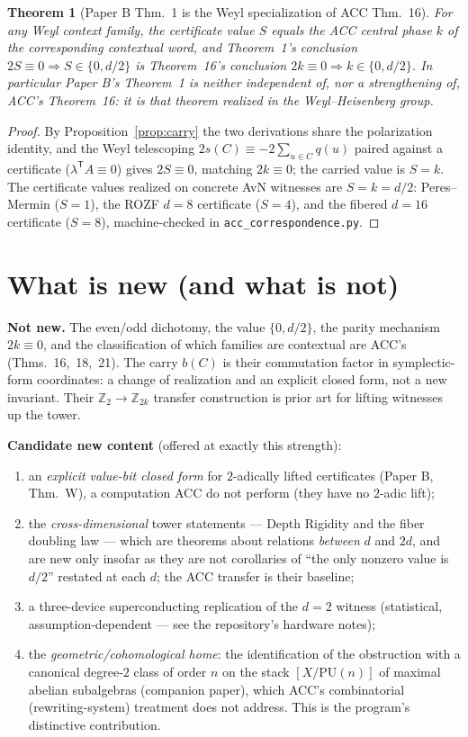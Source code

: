 \documentclass[11pt]{article}
\newtheorem{theorem}{Theorem}
\newcommand{\Z}{\mathbb{Z}}
\begin{document}
\begin{theorem}[Paper B Thm.~1 is the Weyl specialization of ACC Thm.~16]\label{thm:equiv}
For any Weyl context family, the certificate value $S$ equals the ACC central phase $k$ of the
corresponding contextual word, and Theorem~1's conclusion $2S\equiv0\Rightarrow S\in\{0,d/2\}$ is
Theorem~16's conclusion $2k\equiv0\Rightarrow k\in\{0,d/2\}$. In particular Paper B's Theorem~1 is
neither independent of, nor a strengthening of, ACC's Theorem~16: it is that theorem realized in the
Weyl--Heisenberg group.
\end{theorem}
\begin{proof}
By Proposition~\ref{prop:carry} the two derivations share the polarization identity, and the Weyl
telescoping $2s(C)\equiv-2\sum_{u\in C}q(u)$ paired against a certificate ($\lambda^{\mathsf T}A\equiv0$)
gives $2S\equiv0$, matching $2k\equiv0$; the carried value is $S=k$. The certificate values realized on
concrete AvN witnesses are $S=k=d/2$: Peres--Mermin ($S=1$), the ROZF $d=8$ certificate ($S=4$), and the
fibered $d=16$ certificate ($S=8$), machine-checked in \texttt{acc\_correspondence.py}.
\end{proof}

\section{What is new (and what is not)}
\noindent\textbf{Not new.} The even/odd dichotomy, the value $\{0,d/2\}$, the parity mechanism
$2k\equiv0$, and the classification of which families are contextual are ACC's
(Thms.~16,~18,~21). The carry $b(C)$ is their commutation factor in symplectic-form coordinates: a
change of realization and an explicit closed form, not a new invariant. Their $\Z_2\to\Z_{2k}$
transfer construction is prior art for lifting witnesses up the tower.

\medskip
\noindent\textbf{Candidate new content} (offered at exactly this strength):
\begin{enumerate}
\item an \emph{explicit value-bit closed form} for $2$-adically lifted certificates (Paper B, Thm.~W),
a computation ACC do not perform (they have no $2$-adic lift);
\item the \emph{cross-dimensional} tower statements --- Depth Rigidity and the fiber doubling law ---
which are theorems about relations \emph{between} $d$ and $2d$, and are new only insofar as they are not
corollaries of ``the only nonzero value is $d/2$'' restated at each $d$; the ACC transfer is their
baseline;
\item a three-device superconducting replication of the $d=2$ witness (statistical, assumption-dependent
--- see the repository's hardware notes);
\item the \emph{geometric/cohomological home}: the identification of the obstruction with a canonical
degree-$2$ class of order $n$ on the stack $[X/\mathrm{PU}(n)]$ of maximal abelian subalgebras (companion
paper), which ACC's combinatorial (rewriting-system) treatment does not address. This is the program's
distinctive contribution.
\end{enumerate}
\end{document}
